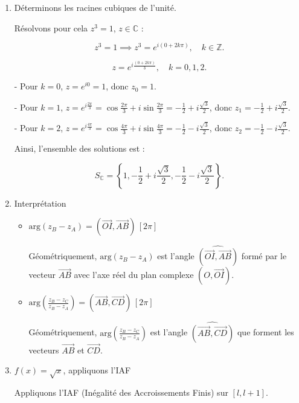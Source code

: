 \documentclass[12pt,a4paper]{article}
\begin{document}
\begin{enumerate}

\item Déterminons les racines cubiques de l'unité.

Résolvons pour cela $z^3 = 1$, $z \in \mathbb{C}$ :

\[
z^3 = 1 \implies z^3 = e^{i(0+2k\pi)}, \quad k \in \mathbb{Z}.
\]

\[
z = e^{i\frac{(0+2k\pi)}{3}}, \quad k = 0, 1, 2.
\]

- Pour $k = 0$, $z = e^{i0} = 1$, donc $z_0 = 1$.

- Pour $k = 1$, $z = e^{i\frac{2\pi}{3}} = \cos\frac{2\pi}{3} + i\sin\frac{2\pi}{3} = -\frac{1}{2} + i\frac{\sqrt{3}}{2}$, donc $z_1 = -\frac{1}{2} + i\frac{\sqrt{3}}{2}$.

- Pour $k = 2$, $z = e^{i\frac{4\pi}{3}} = \cos\frac{4\pi}{3} + i\sin\frac{4\pi}{3} = -\frac{1}{2} - i\frac{\sqrt{3}}{2}$, donc $z_2 = -\frac{1}{2} - i\frac{\sqrt{3}}{2}$.

Ainsi, l'ensemble des solutions est :

\[
S_{\mathbb{C}} = \left\{ 1, -\frac{1}{2} + i\frac{\sqrt{3}}{2}, -\frac{1}{2} - i\frac{\sqrt{3}}{2} \right\}.
\]

\item Interprétation

\begin{itemize}
    \item $\text{arg}(z_B - z_A) = (\overrightarrow{OI}, \overrightarrow{AB}) \, [2\pi]$
    
    Géométriquement, $\text{arg}(z_B - z_A)$ est l'angle $\widehat{(\overrightarrow{OI}, \overrightarrow{AB})}$ formé par le vecteur $\overrightarrow{AB}$ avec l'axe réel du plan complexe $(O, \overrightarrow{OI})$.

    \item $\text{arg}\left(\frac{z_B - z_C}{z_B - z_A}\right) = (\overrightarrow{AB}, \overrightarrow{CD}) \, [2\pi]$
    
    Géométriquement, $\text{arg}\left(\frac{z_B - z_C}{z_B - z_A}\right)$ est l'angle $\widehat{(\overrightarrow{AB}, \overrightarrow{CD})}$ que forment les vecteurs $\overrightarrow{AB}$ et $\overrightarrow{CD}$.
\end{itemize}

\item $f(x) = \sqrt{x}$, appliquons l'IAF

Appliquons l'IAF (Inégalité des Accroissements Finis) sur $[l, l+1]$.


\end{enumerate}
\end{document}
